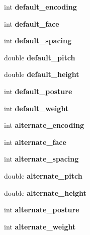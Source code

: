 \begin{Indent}{\bf }\par
{\em \label{_amgrpd41d8cd98f00b204e9800998ecf8427e}
 }\begin{DoxyCompactItemize}
\item 
int {\bf default\_\-encoding}
\item 
int {\bfseries default\_\-face}\label{structhpgs__reader__st_a1567ffd38e5fefe6193fa7dbd68b0214}

\item 
int {\bfseries default\_\-spacing}\label{structhpgs__reader__st_adf010575fe9deb40304f19897e14823a}

\item 
double {\bfseries default\_\-pitch}\label{structhpgs__reader__st_ac9e0c057f334d74a0ed547082c82a858}

\item 
double {\bfseries default\_\-height}\label{structhpgs__reader__st_ad33323846ca9017ec569745d305fdfb3}

\item 
int {\bfseries default\_\-posture}\label{structhpgs__reader__st_ab1723b82575818b75322dcfa6569fd1e}

\item 
int {\bfseries default\_\-weight}\label{structhpgs__reader__st_a9128f39109a96e024bcc5325479c0c0c}

\end{DoxyCompactItemize}
\end{Indent}
\begin{Indent}{\bf }\par
{\em \label{_amgrpd41d8cd98f00b204e9800998ecf8427e}
 }\begin{DoxyCompactItemize}
\item 
int {\bf alternate\_\-encoding}
\item 
int {\bfseries alternate\_\-face}\label{structhpgs__reader__st_ad4664cdeb2e9140523d233d3618ab467}

\item 
int {\bfseries alternate\_\-spacing}\label{structhpgs__reader__st_a973a5b831cb3c9f2daecfa9079f88508}

\item 
double {\bfseries alternate\_\-pitch}\label{structhpgs__reader__st_a6779bb010dc5a5979e7e9181915cf4c2}

\item 
double {\bfseries alternate\_\-height}\label{structhpgs__reader__st_ace276698951871437095e60a206ee947}

\item 
int {\bfseries alternate\_\-posture}\label{structhpgs__reader__st_a62b354f8911769f700b57db1845e41ac}

\item 
int {\bfseries alternate\_\-weight}\label{structhpgs__reader__st_a5d9273b00c3e306a9b80afd92709db24}

\end{DoxyCompactItemize}
\end{Indent}
